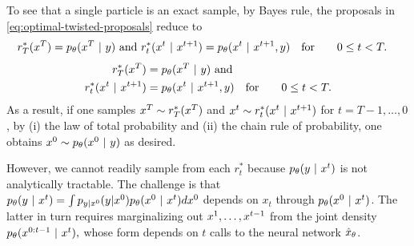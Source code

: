 To see that a single particle is an exact sample, by Bayes rule, the proposals in \cref{eq:optimal-twisted-proposals} reduce to 
\ifnum{}
\begin{align}\label{eq:optimal-twisted-proposals-reduced}
     \proposal_T^{*} (\xT) &= \pmodel(\xT \mid y)\ \mathrm{and}  \ 
     \proposal_t^{*} (\xt \mid \xtpo) = \pmodel ( \xt \mid \xtpo, y)\quad \mathrm{for}  \qquad 0\leq t < T.
\end{align}
 \else
\begin{align}\label{eq:optimal-twisted-proposals-reduced}
     r_T^{*} (x^{T}) &= p_{\theta}(x^{T} ~\vert~ y)\ \mathrm{and}  \\
     r_t^{*} (x^{t} ~\vert~ x^{t+1}) &= p_{\theta} ( x^{t} ~\vert~ x^{t+1}, y)\quad \mathrm{for}  \qquad 0\leq t < T.
\end{align}
 \fi
As a result, 
if one samples $x^{T}\sim r_T^{*}(x^{T})$ and $x^{t}\sim r_t^{*} (x^{t} ~\vert~ x^{t+1})$
for  $t=T-1,\dots, 0$,
by (i) the law of total probability and (ii) the chain rule of probability, 
 one obtains $x^{0} \sim p_{\theta}(x^{0} ~\vert~ y)$ as desired.

However, we cannot readily sample from each $r^*_t$
because $p_{\theta}(y~\vert~ x^{t})$ is not analytically tractable. The challenge is that $p_{\theta}(y~\vert~ x^{t}) = \int p_{y|x^{0}}({y}|{x^{0}}) p_{\theta}(x^{0} ~\vert~ x^{t}) dx^{0} $ depends on $x_t$ through $p_{\theta}(x^{0}~\vert~ x^{t})$. The latter in turn requires marginalizing out $x^{1},\dots, x^{t-1}$ from the joint density $p_{\theta}(x^{0:t-1} ~\vert~ x^{t}),$ 
whose form depends on $t$ calls to the neural network ${\hat x}_\theta$.

